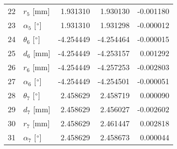 \documentclass{standalone}%
\begin{document}
\begin{tabular}{llrrr}
22 &              $r_{5}$ [mm] &  1.931310 &   1.930130 &  -0.001180 \\
23 &  $\alpha_{5}$ [$\degree$] &  1.931310 &   1.931298 &  -0.000012 \\
24 &  $\theta_{6}$ [$\degree$] & -4.254449 &  -4.254464 &  -0.000015 \\
25 &              $d_{6}$ [mm] & -4.254449 &  -4.253157 &   0.001292 \\
26 &              $r_{6}$ [mm] & -4.254449 &  -4.257253 &  -0.002803 \\
27 &  $\alpha_{6}$ [$\degree$] & -4.254449 &  -4.254501 &  -0.000051 \\
28 &  $\theta_{7}$ [$\degree$] &  2.458629 &   2.458719 &   0.000090 \\
29 &              $d_{7}$ [mm] &  2.458629 &   2.456027 &  -0.002602 \\
30 &              $r_{7}$ [mm] &  2.458629 &   2.461447 &   0.002818 \\
31 &  $\alpha_{7}$ [$\degree$] &  2.458629 &   2.458673 &   0.000044 \\
\bottomrule
\end{tabular}
%
\end{document}
